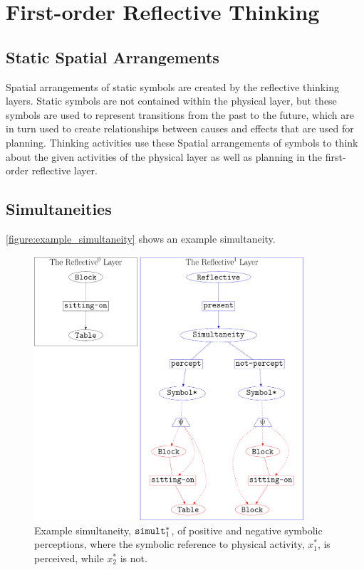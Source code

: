 \chapter{First-order Reflective Thinking}
\label{chapter:first_order_refective_thinking}

\section{Static Spatial Arrangements}

Spatial arrangements of static symbols are created by the reflective
thinking layers.  Static symbols are not contained within the physical
layer, but these symbols are used to represent transitions from the
past to the future, which are in turn used to create relationships
between causes and effects that are used for planning.  Thinking
activities use these Spatial arrangements of symbols to think about
the given activities of the physical layer as well as planning in the
first-order reflective layer.

\section{Simultaneities}

{\mbox{\autoref{figure:example_simultaneity}}} shows an example
simultaneity.
\begin{figure}
\center
\includegraphics[width=10cm]{gfx/example_simultaneity}
\caption[Example simultaneity of positive and negative symbolic
  perceptions.]{Example simultaneity, $\text{\tt{simult}}_1^*$, of
  positive and negative symbolic perceptions, where the symbolic
  reference to physical activity, $x_1^*$, is perceived, while $x_2^*$
  is not.}
\label{figure:example_simultaneity}
\end{figure}

